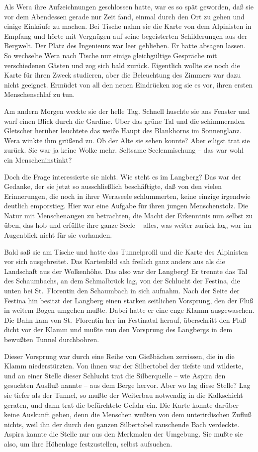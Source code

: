 Als Wera ihre Aufzeichnungen geschlossen hatte, war es so spät
geworden, daß sie vor dem Abendessen gerade nur Zeit fand, einmal
durch den Ort zu gehen und einige Einkäufe zu machen. Bei Tische
nahm sie die Karte von dem Alpinisten in Empfang und hörte mit
Vergnügen auf seine begeisterten Schilderungen aus der Bergwelt.
Der Platz des Ingenieurs war leer geblieben. Er hatte absagen
lassen. So wechselte Wera nach Tische nur einige gleichgültige
Gespräche mit verschiedenen Gästen und zog sich bald zurück.
Eigentlich wollte sie noch die Karte für ihren Zweck studieren,
aber die Beleuchtung des Zimmers war dazu nicht geeignet. Ermüdet
von all den neuen Eindrücken zog sie es vor, ihren ersten
Menschenschlaf zu tun.

Am andern Morgen weckte sie der helle Tag. Schnell huschte sie ans
Fenster und warf einen Blick durch die Gardine. Über das grüne Tal
und die schimmernden Gletscher herüber leuchtete das weiße Haupt
des Blankhorns im Sonnenglanz. Wera winkte ihm grüßend zu. Ob der
Alte sie sehen konnte? Aber eiligst trat sie zurück. Sie war ja
keine Wolke mehr. Seltsame Seelenmischung – das war wohl ein
Menscheninstinkt?

Doch die Frage interessierte sie nicht. Wie steht es im Langberg?
Das war der Gedanke, der sie jetzt so ausschließlich beschäftigte,
daß von den vielen Erinnerungen, die noch in ihrer Weraseele
schlummerten, keine einzige irgendwie deutlich emporstieg. Hier war
eine Aufgabe für ihren jungen Menschenstolz. Die Natur mit
Menschenaugen zu betrachten, die Macht der Erkenntnis nun selbst zu
üben, das hob und erfüllte ihre ganze Seele – alles, was weiter
zurück lag, war im Augenblick nicht für sie vorhanden.

Bald saß sie am Tische und hatte das Tunnelprofil und die Karte des
Alpinisten vor sich ausgebreitet. Das Kartenbild sah freilich ganz
anders aus als die Landschaft aus der Wolkenhöhe. Das also war der
Langberg! Er trennte das Tal des Schaumbachs, an dem Schmalbrück
lag, von der Schlucht der Festina, die unten bei St.~Florentin den
Schaumbach in sich aufnahm. Nach der Seite der Festina hin besitzt
der Langberg einen starken seitlichen Vorsprung, den der Fluß in
weitem Bogen umgehen mußte. Dabei hatte er eine enge Klamm
ausgewaschen. Die Bahn kam von St.~Florentin her im Festinatal
herauf, überschritt den Fluß dicht vor der Klamm und mußte nun den
Vorsprung des Langbergs in dem bewußten Tunnel durchbohren.

Dieser Vorsprung war durch eine Reihe von Gießbächen zerrissen, die
in die Klamm niederstürzten. Von ihnen war der Silbertobel der
tiefste und wildeste, und an einer Stelle dieser Schlucht trat die
Silberquelle – wie Aspira den gesuchten Ausfluß nannte – aus dem
Berge hervor. Aber wo lag diese Stelle? Lag sie tiefer als der
Tunnel, so mußte der Weiterbau notwendig in die Kalkschicht
geraten, und dann trat die befürchtete Gefahr ein. Die Karte konnte
darüber keine Auskunft geben, denn die Menschen wußten von dem
unterirdischen Zufluß nichts, weil ihn der durch den ganzen
Silbertobel rauschende Bach verdeckte. Aspira kannte die Stelle nur
aus den Merkmalen der Umgebung. Sie mußte sie also, um ihre
Höhenlage festzustellen, selbst aufsuchen.

